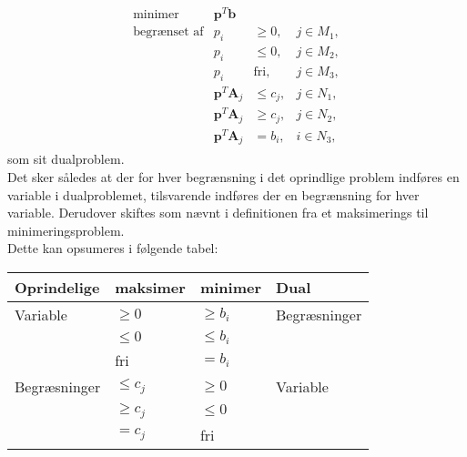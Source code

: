 \begin{align*}
\begin{array}{lrll}
\text{minimer}		&\textbf{p}^T\textbf{b}	&			&\\
\text{begrænset af}	&p_i					&\geq 0,	&j \in M_1,\\
					&p_i					&\leq 0,	&j \in M_2,\\
					&p_i					&\text{fri},	&j \in M_3,\\
					&\textbf{p}^T\textbf{A}_j	&\leq c_j,	&j \in N_1,\\
					&\textbf{p}^T\textbf{A}_j	&\geq c_j,	&j \in N_2,\\
					&\textbf{p}^T\textbf{A}_j	& = b_i,	&i \in N_3,
\end{array}
\end{align*}
som sit dualproblem.
\\
Det sker således at der for hver begrænsning i det oprindlige problem indføres en variable i dualproblemet, tilsvarende indføres der en begrænsning for hver variable. 
Derudover skiftes som nævnt i definitionen fra et maksimerings til minimeringsproblem. \\
Dette kan opsumeres i følgende tabel: \\
\begin{table}[H]
\begin{center}
\begin{tabular}{llll}
Oprindelige  & maksimer   & minimer    & Dual         \\
\hline
Variable     & $\geq 0$   & $\geq b_i$ & Begræsninger \\
             & $\leq 0$   & $\leq b_i$ &              \\
             & fri        & $=b_i$     &              \\
\hline
Begræsninger & $\leq c_j$ & $\geq 0$   & Variable     \\
             & $\geq c_j$ & $\leq 0$   &              \\
             & $=c_j$     & fri        &             
\end{tabular}
\end{center}
\end{table}








